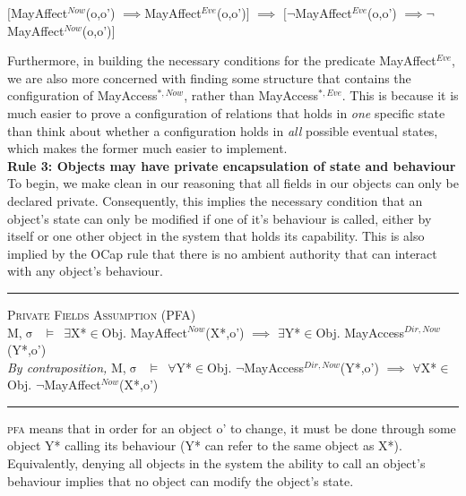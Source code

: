 \documentclass[a4paper,11pt, twoside,twocolumn]{article}
\newenvironment{logic}[1][]
{\begin{flushleft} \small }
{\end{flushleft}}
\newcommand{\loin}{$\in$}
\newcommand{\loforall}{$\forall$}
\newcommand{\loexists}{$\exists$}
\newcommand{\loimplies}{$\implies$}
\newcommand{\losigma}{$\upsigma$}
\newcommand{\loturns} {$\vDash$}
\newcommand{\loneg}{$\boldsymbol \neg$}
\newcommand{\ablock} {\null\qquad}
\begin{document}
\begin{logic}
$[$MayAffect$^{Now}$(o,o') \loimplies MayAffect$^{Eve}$(o,o')$]$\linebreak
\ablock \loimplies\linebreak
$[$\loneg MayAffect$^{Eve}$(o,o') \loimplies \loneg MayAffect$^{Now}$(o,o')$]$\\
\end{logic}

Furthermore, in building the necessary conditions for the predicate MayAffect$^{Eve}$, we are also more concerned with finding some structure that contains the configuration of MayAccess$^{*,Now}$, rather than MayAccess$^{*,Eve}$. This is because it is much easier to prove a configuration of relations that holds in \textit{one} specific state than think about whether a configuration holds in \textit{all} possible eventual states, which makes the former much easier to implement.\\

\textbf{Rule 3: Objects may have private encapsulation of state and behaviour}\\
To begin, we make clean in our reasoning that all fields in our objects can only be declared private. Consequently, this implies the necessary condition that an object's state can only be modified if one of it's behaviour is called, either by itself or one other object in the system that holds its capability. This is also implied by the OCap rule that there is no ambient authority that can interact with any object's behaviour.
\begin{logic}
\hrule\null
\textsc{\normalsize *Private Fields Assumption (PFA)}\\
M,\losigma\ \loturns\ \loexists X*\loin Obj. MayAffect$^{Now}$(X*,o') \loimplies \linebreak
	\ablock \ablock \loexists Y*\loin Obj. MayAccess$^{Dir,Now}$(Y*,o')
\linebreak \\
\textit{By contraposition,}\linebreak
M,\losigma\ \loturns\ 	\loforall Y*\loin Obj. \loneg MayAccess$^{Dir,Now}$(Y*,o') \loimplies \linebreak
	\ablock \ablock \loforall X*\loin Obj. \loneg MayAffect$^{Now}$(X*,o')
\linebreak
\hrule
\end{logic}

\textsc{pfa} means that in order for an object o' to change, it must be done through some object Y* calling its behaviour (Y* can refer to the same object as X*). Equivalently, denying all objects in the system the ability to call an object's behaviour implies that no object can modify the object's state.\\
\end{document}
